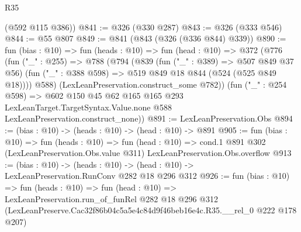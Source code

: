 \begin{lexlean}{R35}
\begin{coremodule}
      (@592 @115 @386))
@841 := @326 (@330 @287)
@843 := @326 (@333 @546)
@844 := @55 @807
@849 := @841 (@843 (@326 (@336 @844) @339))
@890 := fun (bias : @10) =>
  fun (heads : @10) =>
  fun (head : @10) =>
  @372
    (@776
      (fun ("_" : @255) =>
      @788
        (@794
          (@839
            (fun ("_" : @389) => @507 @849 @37 @56)
            (fun ("_" : @388 @598) => @519 @849 @18 @844 (@524 (@525 @849 @18))))
          @588)
        (LexLeanPreservation.construct_some @782))
      (fun ("_" : @254 @598) =>
      @602
        @150
        @45
        @62
        @165
        @165
        @293
        LexLeanTarget.TargetSyntax.Value.none
        @588
        LexLeanPreservation.construct_none))
@891 := LexLeanPreservation.Obs
@894 := (bias : @10) -> (heads : @10) -> (head : @10) -> @891
@905 := fun (bias : @10) =>
  fun (heads : @10) =>
  fun (head : @10) =>
  cond.{1} @891 @302 (LexLeanPreservation.Obs.value @311) LexLeanPreservation.Obs.overflow
@913 := (bias : @10) ->
  (heads : @10) -> (head : @10) -> LexLeanPreservation.RunConv @282 @18 @296 @312
@926 := fun (bias : @10) =>
  fun (heads : @10) =>
  fun (head : @10) =>
  LexLeanPreservation.run_of_funRel
    @282
    @18
    @296
    @312
    (LexLeanPreserve.Cac32f86b04c5a5e4c84d9f46beb16e4c.R35.__rel_0 @222 @178 @207)
\end{coremodule}
\end{lexlean}
